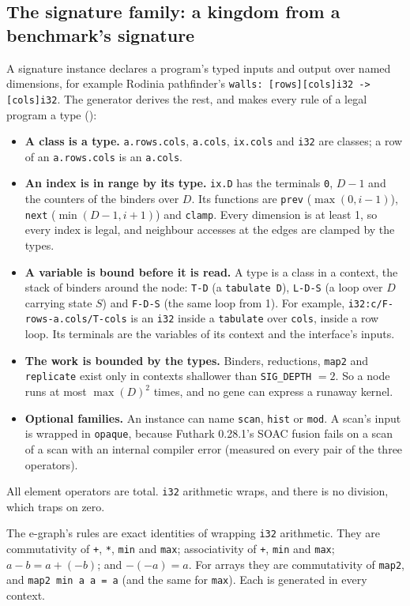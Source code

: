 \documentclass[sigconf,nonacm]{acmart}
\DeclareRobustCommand{\src}[1]{{\footnotesize\path{#1}}}
\newcommand{\ty}[1]{\texttt{#1}}
\begin{document}
\subsection{The signature family: a kingdom from a benchmark's signature}
\label{sec:sig}
A signature instance declares a program's typed inputs and output over named
dimensions, for example Rodinia pathfinder's
\texttt{walls: [rows][cols]i32 -> [cols]i32}. The generator derives the rest,
and makes every rule of a legal program a type
(\src{kingdoms/futhark/gen_tables.py:1684-1811}):
\begin{itemize}
\item \textbf{A class is a type.} \ty{a.rows.cols}, \ty{a.cols}, \ty{ix.cols}
  and \ty{i32} are classes; a row of an \ty{a.rows.cols} is an \ty{a.cols}.
\item \textbf{An index is in range by its type.} \ty{ix.D} has the terminals
  \texttt{0}, $D{-}1$ and the counters of the binders over $D$. Its functions are
  \texttt{prev} ($\max(0,i{-}1)$), \texttt{next} ($\min(D{-}1,i{+}1)$) and
  \texttt{clamp}. Every dimension is at least 1, so every index is legal, and
  neighbour accesses at the edges are clamped by the types.
\item \textbf{A variable is bound before it is read.} A type is a class in a
  context, the stack of binders around the node: \texttt{T-D} (a
  \texttt{tabulate D}), \texttt{L-D-S} (a loop over $D$ carrying state $S$) and
  \texttt{F-D-S} (the same loop from 1). For example,
  \ty{i32:c/\allowbreak F-rows-a.cols/\allowbreak T-cols} is an \texttt{i32} inside a \texttt{tabulate}
  over \texttt{cols}, inside a row loop. Its terminals are the variables of its
  context and the interface's inputs.
\item \textbf{The work is bounded by the types.} Binders, reductions,
  \texttt{map2} and \texttt{replicate} exist only in contexts shallower than
  \texttt{SIG\_DEPTH} $=2$. So a node runs at most $\max(D)^2$ times, and no gene
  can express a runaway kernel.
\item \textbf{Optional families.} An instance can name \texttt{scan},
  \texttt{hist} or \texttt{mod}. A scan's input is wrapped in \texttt{opaque},
  because Futhark 0.28.1's SOAC fusion fails on a scan of a scan with an
  internal compiler error (measured on every pair of the three operators).
\end{itemize}
All element operators are total. \texttt{i32} arithmetic wraps, and there is
no division, which traps on zero.

The e-graph's rules are exact identities of wrapping \texttt{i32} arithmetic.
They are commutativity of \texttt{+}, \texttt{*}, \texttt{min} and
\texttt{max}; associativity of \texttt{+}, \texttt{min} and \texttt{max};
$a-b=a+(-b)$; and $-(-a)=a$. For arrays they are commutativity of
\texttt{map2}, and \texttt{map2 min a a = a} (and the same for \texttt{max}).
Each is generated in every context.
\end{document}
